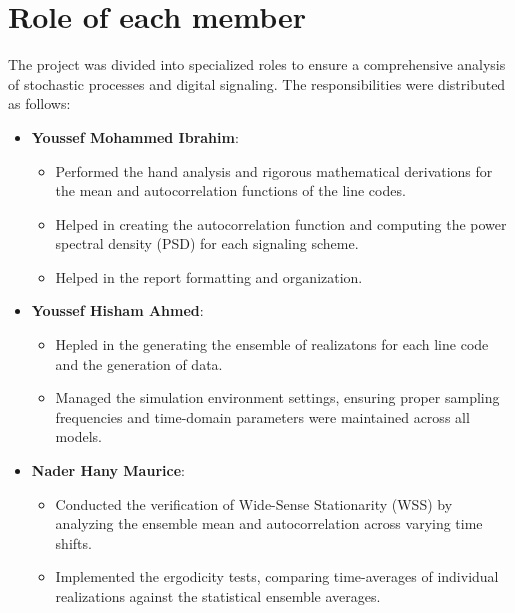 \thispagestyle{plain}

\chapter*{Role of each member}

The project was divided into specialized roles to ensure a comprehensive
analysis of stochastic processes and digital signaling. The responsibilities
were distributed as follows:

\begin{itemize}
    \item \textbf{Youssef Mohammed Ibrahim}:
          \begin{itemize}
              \item Performed the hand analysis and rigorous mathematical derivations for the mean
                    and autocorrelation functions of the line codes.
              \item Helped in creating the autocorrelation function and computing the power
                    spectral density (PSD) for each signaling scheme.
              \item Helped in the report formatting and organization.
          \end{itemize}

    \item \textbf{Youssef Hisham Ahmed}:
          \begin{itemize}
              \item Hepled in the generating the ensemble of realizatons for each line code and the
                    generation of data.
              \item Managed the simulation environment settings, ensuring proper sampling
                    frequencies and time-domain parameters were maintained across all models.
          \end{itemize}

    \item \textbf{Nader Hany Maurice}:
          \begin{itemize}
              \item Conducted the verification of Wide-Sense Stationarity (WSS) by analyzing the
                    ensemble mean and autocorrelation across varying time shifts.
              \item Implemented the ergodicity tests, comparing time-averages of individual
                    realizations against the statistical ensemble averages.
          \end{itemize}


\end{itemize}
